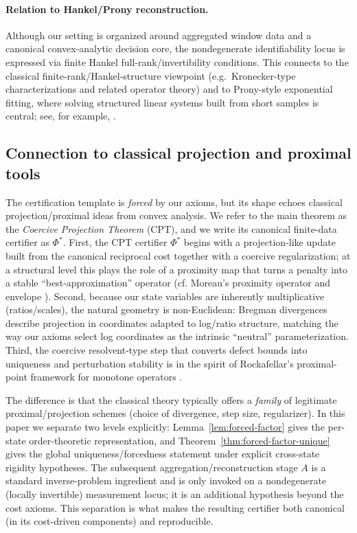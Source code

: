 \documentclass[11pt,reqno]{amsart}
\theoremstyle{definition}
\theoremstyle{remark}
\newcommand{\1}{\mathbf{1}}
\begin{document}
\paragraph{Relation to Hankel/Prony reconstruction.} Although our setting is organized around aggregated window data and a canonical convex-analytic decision core, the nondegenerate identifiability locus is expressed via finite Hankel full-rank/invertibility conditions. This connects to the classical finite-rank/Hankel-structure viewpoint (e.g.\ Kronecker-type characterizations and related operator theory) and to Prony-style exponential fitting, where solving structured linear systems built from short samples is central; see, for example, \cite{peller2003hankel,osborne1995prony}.

\subsection{Connection to classical projection and proximal tools}
The certification template is \emph{forced} by our axioms, but its shape echoes classical projection/proximal
ideas from convex analysis. We refer to the main theorem as the \emph{Coercive Projection Theorem} (CPT), and we
write its canonical finite-data certifier as $\Phi^\ast$. First, the CPT certifier $\Phi^\ast$ begins with a projection-like update built from the
canonical reciprocal cost together with a coercive regularization; at a structural level this plays the role of
a proximity map that turns a penalty into a stable ``best-approximation'' operator (cf. Moreau's proximity
operator and envelope \cite{moreau1965}). Second, because our state variables are inherently multiplicative
(ratios/scales), the natural geometry is non-Euclidean: Bregman divergences \cite{bregman1967} describe projection in coordinates adapted to log/ratio structure, matching the way our axioms select log coordinates as
the intrinsic ``neutral'' parameterization. Third, the coercive resolvent-type step that converts defect bounds
into uniqueness and perturbation stability is in the spirit of Rockafellar's proximal-point framework for
monotone operators \cite{rockafellar1976}.

The difference is that the classical theory typically offers a \emph{family} of legitimate proximal/projection
schemes (choice of divergence, step size, regularizer). In this paper we separate two levels explicitly: Lemma~\ref{lem:forced-factor} gives the per-state order-theoretic representation, and Theorem~\ref{thm:forced-factor-unique} gives the global uniqueness/forcedness statement under explicit cross-state rigidity hypotheses. The subsequent aggregation/reconstruction stage $A$ is a standard inverse-problem ingredient and is only invoked on a nondegenerate (locally invertible) measurement locus; it is an additional hypothesis beyond the cost axioms. This separation is what makes the resulting certifier both canonical (in its cost-driven components) and reproducible.
\end{document}
